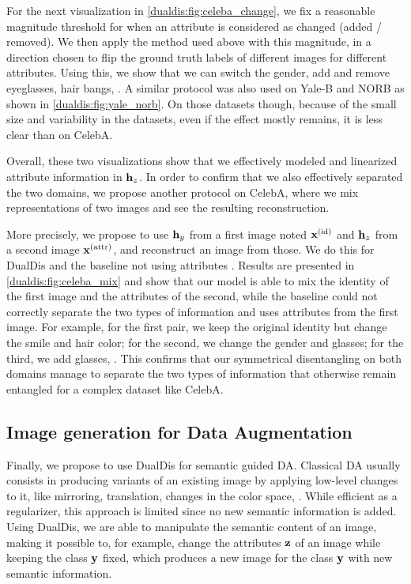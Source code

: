 For the next visualization in \autoref{dualdis:fig:celeba_change}, we fix a reasonable magnitude threshold for when an attribute is considered as changed (\ie added / removed). We then apply the method used above with this magnitude, in a direction chosen to flip the ground truth labels of different images for different attributes. Using this, we show that we can switch the gender, add and remove eyeglasses, hair bangs, \etc. A similar protocol was also used on Yale-B and NORB as shown in \autoref{dualdis:fig:yale_norb}. On those datasets though, because of the small size and variability in the datasets, even if the effect mostly remains, it is less clear than on CelebA.

Overall, these two visualizations show that we effectively modeled and linearized attribute information in $\mathbf{h}_z$. In order to confirm that we also effectively separated the two domains, we propose another protocol on CelebA, where we mix representations of two images and see the resulting reconstruction.

More precisely, we propose to use $\mathbf{h}_y$ from a first image noted $\mathbf{x}^{\mathrm{(id)}}$ and $\mathbf{h}_z$ from a second image $\mathbf{x}^{\mathrm{(attr)}}$, and reconstruct an image from those. We do this for DualDis and the baseline not using attributes \Yref \citep{Hadad2018,Liu2018a}. Results are presented in \autoref{dualdis:fig:celeba_mix} and show that our model is able to mix the identity of the first image and the attributes of the second, while the baseline could not correctly separate the two types of information and uses attributes from the first image. For example, for the first pair, we keep the original identity but change the smile and hair color; for the second, we change the gender and glasses; for the third, we add glasses, \etc. This confirms that our symmetrical disentangling on both domains manage to separate the two types of information that otherwise remain entangled for a complex dataset like CelebA.


\subsection{Image generation for Data Augmentation}

Finally, we propose to use DualDis for semantic guided \acf{DA}. Classical \ac{DA} usually consists in producing variants of an existing image by applying low-level changes to it, like mirroring, translation, changes in the color space, \etc. While efficient as a regularizer, this approach is limited since no new semantic information is added. Using DualDis, we are able to manipulate the semantic content of an image, making it possible to, for example, change the attributes $\mathbf{z}$ of an image while keeping the class $\mathbf{y}$ fixed, which produces a new image for the class $\mathbf{y}$ with new semantic information.

